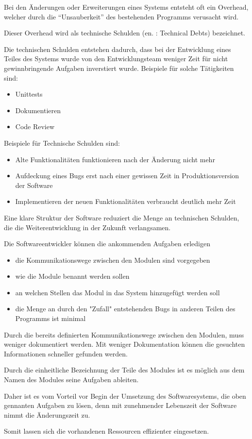 Bei den Änderungen oder Erweiterungen eines Systems entsteht oft ein Overhead, welcher durch die ``Unsauberkeit'' des bestehenden Programms verusacht wird.

Dieser Overhead wird als technische Schulden (en. : Technical Debts) bezeichnet.

Die technischen Schulden entstehen dadurch, dass bei der Entwicklung eines Teiles des Systems wurde 
von den Entwicklungsteam weniger Zeit für nicht gewinnbringende Aufgaben inverstiert wurde.
Beispiele für solche Tätigkeiten sind:
\begin{itemize}
    \item Unittests
    \item Dokumentieren 
    \item Code Review
\end{itemize}

Beispiele für Technische Schulden sind:
\begin{itemize}
    \item Alte Funktionalitäten funktionieren nach der Änderung nicht mehr
    \item Aufdeckung eines Bugs erst nach einer gewissen Zeit in Produktionsversion der Software
    \item Implementieren der neuen Funktionalitäten verbraucht deutlich mehr Zeit
\end{itemize}

Eine klare Struktur der Software reduziert die Menge an technischen Schulden, 
die die Weiterentwicklung in der Zukunft verlangsamen. 

Die Softwareentwickler können die ankommenden Aufgaben erledigen
\begin{itemize}
    \item die Kommunikationswege zwischen den Modulen sind vorgegeben
    \item wie die Module benannt werden sollen
    \item an welchen Stellen das Modul in das System hinzugefügt werden soll
    \item die Menge an durch den "Zufall" entstehenden Bugs in anderen Teilen des Programms ist minimal
\end{itemize}

Durch die bereits definierten Kommunikationswege zwischen den Modulen, muss weniger dokumentiert werden.
Mit weniger Dokumentation können die gesuchten Informationen schneller gefunden werden.

Durch die einheitliche Bezeichnung der Teile des Modules ist es möglich aus dem Namen des Modules seine Aufgaben ableiten.

Daher ist es vom Vorteil vor Begin der Umsetzung des Softwaresystems, die oben gennanten Aufgaben zu lösen,
denn mit zunehmender Lebenszeit der Software nimmt die Änderungszeit zu.

Somit lassen sich die vorhandenen Ressourcen effizienter eingesetzen.